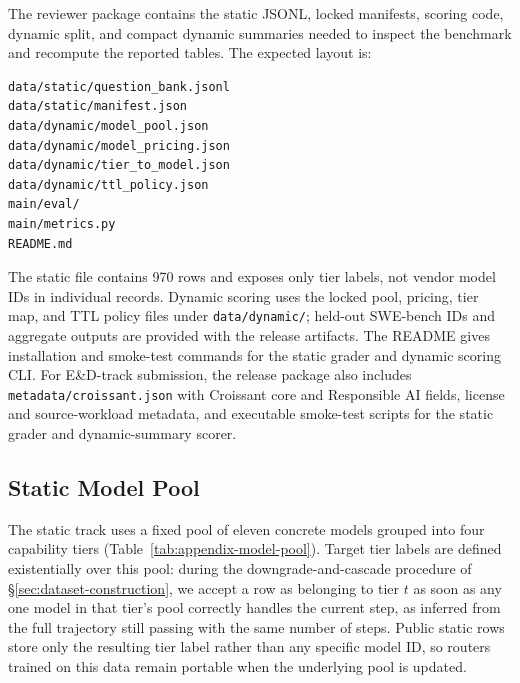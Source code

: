 The reviewer package contains the static JSONL, locked manifests, scoring code,
dynamic split, and compact dynamic summaries needed to inspect the benchmark and
recompute the reported tables. The expected layout is:

\begin{center}
\begin{minipage}{0.95\linewidth}
\scriptsize
\begin{verbatim}
data/static/question_bank.jsonl
data/static/manifest.json
data/dynamic/model_pool.json
data/dynamic/model_pricing.json
data/dynamic/tier_to_model.json
data/dynamic/ttl_policy.json
main/eval/
main/metrics.py
README.md
\end{verbatim}
\end{minipage}
\end{center}

The static file contains 970 rows and exposes only tier labels, not vendor model
IDs in individual records. Dynamic scoring uses the locked pool, pricing, tier
map, and TTL policy files under \texttt{data/dynamic/}; held-out SWE-bench IDs
and aggregate outputs are provided with the release artifacts. The README gives
installation and smoke-test commands for the static grader and dynamic scoring
CLI. For E\&D-track submission, the release package also includes
\texttt{metadata/croissant.json} with Croissant core and Responsible AI fields,
license and source-workload metadata, and executable smoke-test scripts for the
static grader and dynamic-summary scorer.

\subsection{Static Model Pool}
\label{app:model-pool}

The static track uses a fixed pool of eleven concrete models grouped into four
capability tiers (Table~\ref{tab:appendix-model-pool}). Target tier labels are
defined existentially over this pool: during the downgrade-and-cascade
procedure of \S\ref{sec:dataset-construction}, we accept a row as belonging to
tier $t$ as soon as any one model in that tier's pool correctly handles the
current step, as inferred from the full trajectory still passing with the
same number of steps. Public static rows store only
the resulting tier label rather than any specific model ID, so routers trained
on this data remain portable when the underlying pool is updated.

